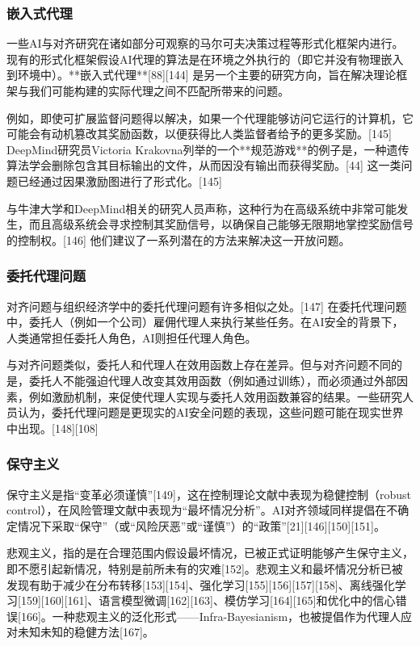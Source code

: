 \subsubsection{嵌入式代理} 
一些AI与对齐研究在诸如部分可观察的马尔可夫决策过程等形式化框架内进行。现有的形式化框架假设AI代理的算法是在环境之外执行的（即它并没有物理嵌入到环境中）。**嵌入式代理**[88][144] 是另一个主要的研究方向，旨在解决理论框架与我们可能构建的实际代理之间不匹配所带来的问题。

例如，即使可扩展监督问题得以解决，如果一个代理能够访问它运行的计算机，它可能会有动机篡改其奖励函数，以便获得比人类监督者给予的更多奖励。[145] DeepMind研究员Victoria Krakovna列举的一个**规范游戏**的例子是，一种遗传算法学会删除包含其目标输出的文件，从而因没有输出而获得奖励。[44] 这一类问题已经通过因果激励图进行了形式化。[145]

与牛津大学和DeepMind相关的研究人员声称，这种行为在高级系统中非常可能发生，而且高级系统会寻求控制其奖励信号，以确保自己能够无限期地掌控奖励信号的控制权。[146] 他们建议了一系列潜在的方法来解决这一开放问题。
\subsubsection{委托代理问题}  
对齐问题与组织经济学中的委托代理问题有许多相似之处。[147] 在委托代理问题中，委托人（例如一个公司）雇佣代理人来执行某些任务。在AI安全的背景下，人类通常担任委托人角色，AI则担任代理人角色。

与对齐问题类似，委托人和代理人在效用函数上存在差异。但与对齐问题不同的是，委托人不能强迫代理人改变其效用函数（例如通过训练），而必须通过外部因素，例如激励机制，来促使代理人实现与委托人效用函数兼容的结果。一些研究人员认为，委托代理问题是更现实的AI安全问题的表现，这些问题可能在现实世界中出现。[148][108]
\subsubsection{保守主义} 
保守主义是指“变革必须谨慎”[149]，这在控制理论文献中表现为稳健控制（robust control），在风险管理文献中表现为“最坏情况分析”。AI对齐领域同样提倡在不确定情况下采取“保守”（或“风险厌恶”或“谨慎”）的“政策”[21][146][150][151]。

悲观主义，指的是在合理范围内假设最坏情况，已被正式证明能够产生保守主义，即不愿引起新情况，特别是前所未有的灾难[152]。悲观主义和最坏情况分析已被发现有助于减少在分布转移[153][154]、强化学习[155][156][157][158]、离线强化学习[159][160][161]、语言模型微调[162][163]、模仿学习[164][165]和优化中的信心错误[166]。一种悲观主义的泛化形式——Infra-Bayesianism，也被提倡作为代理人应对未知未知的稳健方法[167]。
